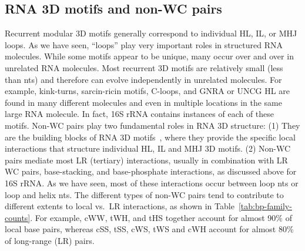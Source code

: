 \subsection{RNA 3D motifs and non-WC pairs}

Recurrent modular 3D motifs generally correspond to individual HL, IL, or MHJ
loops. As we have seen, ``loops'' play very important roles in structured RNA
molecules. While some motifs appear to be unique, many occur over and over in
unrelated RNA molecules. Most recurrent 3D motifs are relatively small (less
than  nts) and therefore can evolve independently in unrelated
molecules. For example, kink-turns, sarcin-ricin motifs, C-loops, and GNRA or
UNCG HL are found in many different molecules and even in multiple locations in
the same large RNA molecule. In fact, 16S rRNA contains instances of each of
these motifs. Non-WC pairs play two fundamental roles in RNA 3D structure: (1)
They are the building blocks of RNA 3D motifs~\cite{Leontis2006}, where they
provide the specific local interactions that structure individual HL, IL and MHJ
3D motifs. (2) Non-WC pairs mediate most LR (tertiary) interactions, usually in
combination with LR WC pairs, base-stacking, and base-phosphate interactions, as
discussed above for 16S rRNA\@. As we have seen, most of these interactions occur
between loop nts or loop and helix nts. The different types of non-WC pairs tend
to contribute to different extents to local vs.\ LR interactions, as shown in
Table~\ref{tab:bp-family-counts}. For example, cWW, tWH, and tHS together
account for almost 90\% of local base pairs, whereas cSS, tSS, cWS, tWS and cWH
account for almost 80\% of long-range (LR) pairs. 


